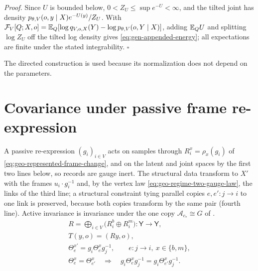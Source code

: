\noindent\emph{Proof.}
Since $U$ is bounded below, $0<Z_U\leq\sup e^{-U}<\infty$, and the tilted joint has density
$p_{\theta,V}(o,y\mid X)e^{-U(y)}/Z_U$. With $\mathcal F_V[Q;X,o]=\mathbb E_Q[\log q_{V,o,X}(Y)-\log p_{\theta,V}(o,Y\mid X)]$,
adding $\mathbb E_QU$ and splitting $\log Z_U$ off the tilted log density gives \eqref{eq:gen-appended-energy}; all
expectations are finite under the stated integrability. \hfill$\square$

The directed construction is used because its normalization does not depend on the parameters.

\section{Covariance under passive frame re-expression}
\label{sec:gen-gauge}

A passive re-expression $(g_i)_{i\in V}$ acts on samples through $R_i^x=\rho_x(g_i)$ of
\eqref{eq:geo-represented-frame-change}, and on the latent and joint spaces by the first two lines
below, so records are gauge inert. The structural data transform to $X'$ with the frames
$u_i\cdot g_i^{-1}$ and, by the vertex law \eqref{eq:geo-regime-two-gauge-law}, the links of the third
line; a structural constraint tying parallel copies $e,e':j\to i$ to one link is preserved, because both
copies transform by the same pair (fourth line). Active invariance is invariance under the one copy
$\mathcal A_{c_*}\cong G$ of .
\begin{gather}
R=\bigoplus_{i\in V}\bigl(R_i^b\oplus R_i^m\bigr):\mathsf Y\longrightarrow\mathsf Y,
\label{eq:gen-rep-actions}\\
T(y,o)=(Ry,o),
\label{eq:gen-contextual-frame-change}\\
\Theta_e^{x\prime}=g_i\Theta_e^xg_j^{-1},
\qquad e:j\to i,\ x\in\{b,m\},
\label{eq:gen-gauge-links}\\
\Theta_e^x=\Theta_{e'}^x
\quad\Longrightarrow\quad
g_i\Theta_e^xg_j^{-1}=g_i\Theta_{e'}^xg_j^{-1}.
\label{eq:gen-shared-link-admissibility}
\end{gather}

